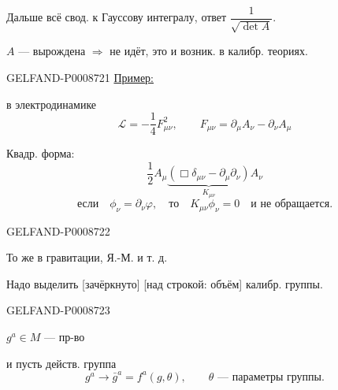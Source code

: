 Дальше всё свод. к Гауссову интегралу, ответ $\dfrac1{\sqrt{\det A}}$.

$A$ --- вырождена $\Rightarrow$ не идёт, это и возник. в калибр. теориях.


\begin{GelfandAdjacentEvidence}{GELFAND-P000872}{1}
\uline{Пример:}

в электродинамике
\begin{equation*}
\mathcal L=-\frac14F_{\mu\nu}^2,\qquad
F_{\mu\nu}=\partial_\mu A_\nu-\partial_\nu A_\mu
\tag{8}
\end{equation*}

Квадр. форма:
\begin{equation*}
\frac12 A_\mu\underbrace{(\Box\delta_{\mu\nu}-\partial_\mu\partial_\nu)}_{K_{\mu\nu}}A_\nu
\tag{9}
\end{equation*}
\begin{equation*}
\text{если}\quad\phi_\nu=\partial_\nu\varphi,
\quad\text{то}\quad K_{\mu\nu}\phi_\nu=0
\quad\text{и не обращается.}
\tag{10}
\end{equation*}
\end{GelfandAdjacentEvidence}
\begin{GelfandAdjacentEvidence}{GELFAND-P000872}{2}


То же в гравитации, Я.-М. и т. д.

Надо выделить [зачёркнуто] [над строкой: объём] калибр. группы.
\end{GelfandAdjacentEvidence}
\begin{GelfandAdjacentEvidence}{GELFAND-P000872}{3}


$g^a\in M$ --- пр-во

и пусть действ. группа
\begin{equation*}
g^a\longrightarrow\bar g^a=f^a(g,\theta),
\qquad\theta\text{ --- параметры группы.}
\tag{11}
\end{equation*}
\end{GelfandAdjacentEvidence}
